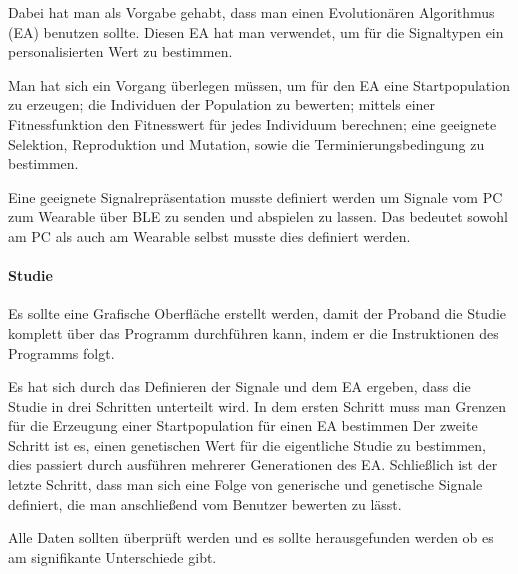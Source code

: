 Dabei hat man als Vorgabe gehabt, dass man einen Evolution{\"a}ren Algorithmus (EA) benutzen sollte.
Diesen EA hat man verwendet, um f{\"u}r die Signaltypen ein personalisierten Wert zu bestimmen.

Man hat sich ein Vorgang {\"u}berlegen m{\"u}ssen, um f{\"u}r den EA eine Startpopulation zu erzeugen; die Individuen der Population zu bewerten; mittels einer Fitnessfunktion den Fitnesswert f{\"u}r jedes Individuum berechnen; eine geeignete Selektion, Reproduktion und Mutation, sowie die Terminierungsbedingung zu bestimmen. 

Eine geeignete Signalrepr{\"a}sentation musste definiert werden um Signale vom PC zum Wearable {\"u}ber BLE zu senden und abspielen zu lassen. Das bedeutet sowohl am PC als auch am Wearable selbst musste dies definiert werden.

\paragraph{Studie}

Es sollte eine Grafische Oberfl{\"a}che erstellt werden, damit der Proband die Studie komplett {\"u}ber das Programm durchf{\"u}hren kann, indem er die Instruktionen des Programms folgt.

Es hat sich durch das Definieren der Signale und dem EA ergeben, dass die Studie in drei Schritten unterteilt wird. 
In dem ersten Schritt muss man Grenzen f{\"u}r die Erzeugung einer Startpopulation f{\"u}r einen EA bestimmen 
Der zweite Schritt ist es, einen genetischen Wert f{\"u}r die eigentliche Studie zu bestimmen, dies passiert durch ausf{\"u}hren mehrerer Generationen des EA. 
Schließlich ist der letzte Schritt, dass man sich eine Folge von generische und genetische Signale definiert, die man anschließend vom Benutzer bewerten zu lässt.

Alle Daten sollten {\"u}berpr{\"u}ft werden und es sollte herausgefunden werden ob es am signifikante Unterschiede gibt.




